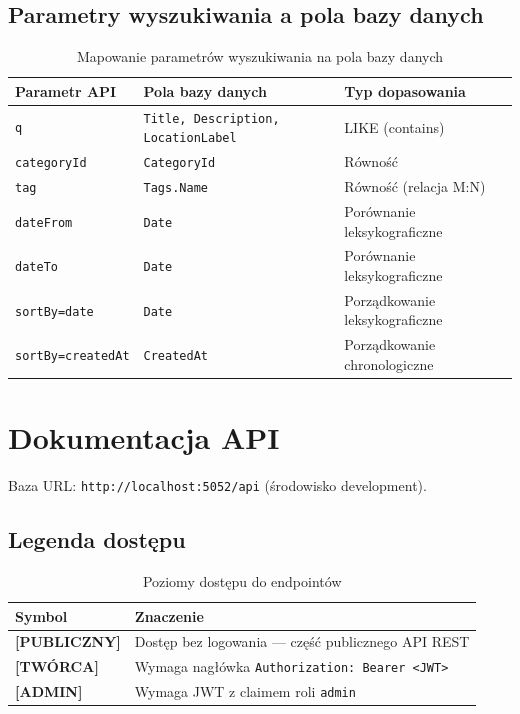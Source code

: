 \documentclass[12pt, a4paper]{article}
\begin{document}
\subsection{Parametry wyszukiwania a pola bazy danych}

\begin{table}[H]
  \centering
  \caption{Mapowanie parametrów wyszukiwania na pola bazy danych}
  \begin{tabular}{@{}L{3.5cm}L{4.5cm}L{5.5cm}@{}}
    \toprule
    \textbf{Parametr API} & \textbf{Pola bazy danych} & \textbf{Typ dopasowania} \\
    \midrule
    \texttt{q}           & \texttt{Title, Description, LocationLabel} & LIKE (contains) \\
    \texttt{categoryId}  & \texttt{CategoryId}                         & Równość \\
    \texttt{tag}         & \texttt{Tags.Name}                          & Równość (relacja M:N) \\
    \texttt{dateFrom}    & \texttt{Date}                               & Porównanie leksykograficzne \\
    \texttt{dateTo}      & \texttt{Date}                               & Porównanie leksykograficzne \\
    \texttt{sortBy=date} & \texttt{Date}                               & Porządkowanie leksykograficzne \\
    \texttt{sortBy=createdAt} & \texttt{CreatedAt}                     & Porządkowanie chronologiczne \\
    \bottomrule
  \end{tabular}
\end{table}

\section{Dokumentacja API}

Baza URL: \texttt{http://localhost:5052/api} (środowisko development).

\subsection{Legenda dostępu}

\begin{table}[H]
  \centering
  \caption{Poziomy dostępu do endpointów}
  \begin{tabular}{@{}L{3.5cm}L{10cm}@{}}
    \toprule
    \textbf{Symbol} & \textbf{Znaczenie} \\
    \midrule
    \textbf{[PUBLICZNY]} & Dostęp bez logowania — część publicznego API REST \\
    \textbf{[TWÓRCA]}    & Wymaga nagłówka \texttt{Authorization: Bearer <JWT>} \\
    \textbf{[ADMIN]}     & Wymaga JWT z claimem roli \texttt{admin} \\
    \bottomrule
  \end{tabular}
\end{table}
\end{document}
